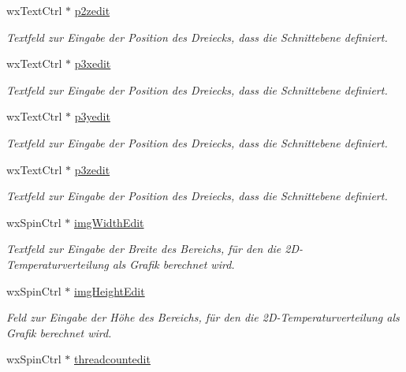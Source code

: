 \begin{DoxyCompactItemize}
wx\-Text\-Ctrl $\ast$ \hyperlink{classGUICutRenderWindow_affad4d5ff6cf42dd585a1a5f0e050075}{p2zedit}
\begin{DoxyCompactList}\small\item\em Textfeld zur Eingabe der Position des Dreiecks, dass die Schnittebene definiert. \end{DoxyCompactList}\item 
wx\-Text\-Ctrl $\ast$ \hyperlink{classGUICutRenderWindow_a3382e7bd629988774c4f5e81bf66ca7e}{p3xedit}
\begin{DoxyCompactList}\small\item\em Textfeld zur Eingabe der Position des Dreiecks, dass die Schnittebene definiert. \end{DoxyCompactList}\item 
wx\-Text\-Ctrl $\ast$ \hyperlink{classGUICutRenderWindow_a5f908b41a4d9db847cd89c0a3c52b61a}{p3yedit}
\begin{DoxyCompactList}\small\item\em Textfeld zur Eingabe der Position des Dreiecks, dass die Schnittebene definiert. \end{DoxyCompactList}\item 
wx\-Text\-Ctrl $\ast$ \hyperlink{classGUICutRenderWindow_ac4c2f8825a9596f32093f0ac08a7848d}{p3zedit}
\begin{DoxyCompactList}\small\item\em Textfeld zur Eingabe der Position des Dreiecks, dass die Schnittebene definiert. \end{DoxyCompactList}\item 
wx\-Spin\-Ctrl $\ast$ \hyperlink{classGUICutRenderWindow_a211043ba4bd60862a9fbfe1186c40875}{img\-Width\-Edit}
\begin{DoxyCompactList}\small\item\em Textfeld zur Eingabe der Breite des Bereichs, für den die 2\-D-\/\-Temperaturverteilung als Grafik berechnet wird. \end{DoxyCompactList}\item 
wx\-Spin\-Ctrl $\ast$ \hyperlink{classGUICutRenderWindow_a4daa569840f00756e6781ad2d87aef5b}{img\-Height\-Edit}
\begin{DoxyCompactList}\small\item\em Feld zur Eingabe der Höhe des Bereichs, für den die 2\-D-\/\-Temperaturverteilung als Grafik berechnet wird. \end{DoxyCompactList}\item 
wx\-Spin\-Ctrl $\ast$ \hyperlink{classGUICutRenderWindow_ae48406dc8c80240904ca7040b7b3fbf1}{threadcountedit}

\end{DoxyCompactItemize}
